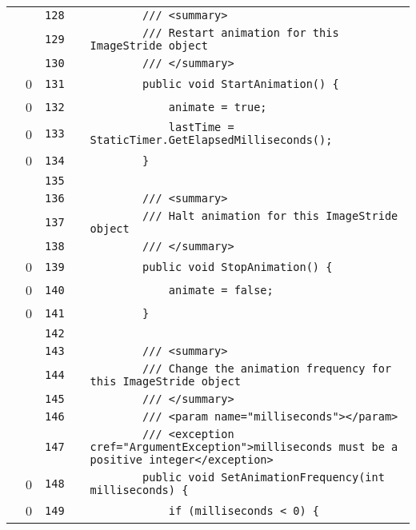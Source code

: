 \documentclass[a4paper,landscape,10pt]{article}
\begin{document}
\begin{longtable}[l]{lrrll}
\cellcolor{gray} &  & \verb~128~ & & \verb~        /// <summary>~\\
\cellcolor{gray} &  & \verb~129~ & & \verb~        /// Restart animation for this ImageStride object~\\
\cellcolor{gray} &  & \verb~130~ & & \verb~        /// </summary>~\\
\cellcolor{red} & 0 & \verb~131~ & & \verb~        public void StartAnimation() {~\\
\cellcolor{red} & 0 & \verb~132~ & & \verb~            animate = true;~\\
\cellcolor{red} & 0 & \verb~133~ & & \verb~            lastTime = StaticTimer.GetElapsedMilliseconds();~\\
\cellcolor{red} & 0 & \verb~134~ & & \verb~        }~\\
\cellcolor{gray} &  & \verb~135~ & & \verb~~\\
\cellcolor{gray} &  & \verb~136~ & & \verb~        /// <summary>~\\
\cellcolor{gray} &  & \verb~137~ & & \verb~        /// Halt animation for this ImageStride object~\\
\cellcolor{gray} &  & \verb~138~ & & \verb~        /// </summary>~\\
\cellcolor{red} & 0 & \verb~139~ & & \verb~        public void StopAnimation() {~\\
\cellcolor{red} & 0 & \verb~140~ & & \verb~            animate = false;~\\
\cellcolor{red} & 0 & \verb~141~ & & \verb~        }~\\
\cellcolor{gray} &  & \verb~142~ & & \verb~~\\
\cellcolor{gray} &  & \verb~143~ & & \verb~        /// <summary>~\\
\cellcolor{gray} &  & \verb~144~ & & \verb~        /// Change the animation frequency for this ImageStride object~\\
\cellcolor{gray} &  & \verb~145~ & & \verb~        /// </summary>~\\
\cellcolor{gray} &  & \verb~146~ & & \verb~        /// <param name="milliseconds"></param>~\\
\cellcolor{gray} &  & \verb~147~ & & \verb~        /// <exception cref="ArgumentException">milliseconds must be a positive integer</exception>~\\
\cellcolor{red} & 0 & \verb~148~ & & \verb~        public void SetAnimationFrequency(int milliseconds) {~\\
\cellcolor{red} & 0 & \verb~149~ & & \verb~            if (milliseconds < 0) {~\\

\end{longtable}
\end{document}

